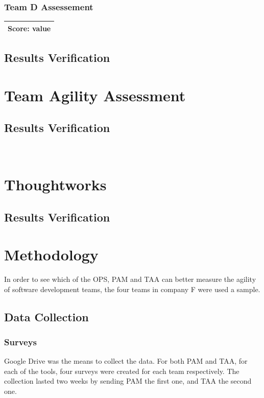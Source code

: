 \subsubsection{Team D Assessement}
\begin{tabular}{| p{3cm} | }
\hline
\textbf{Score:} value \\ \hline
\end{tabular}

\subsection{Results Verification}



\section{Team Agility Assessment}
\subsection{Results Verification}
~

\section{Thoughtworks}
\subsection{Results Verification}




\section{Methodology}
In order to see which of the OPS, PAM and TAA can better measure the agility of software development teams, the four teams in company F were used a sample.

\subsection{Data Collection}

\subsubsection{Surveys}
Google Drive \texttrademark \cite{google_drive} was the means to collect the data. For both PAM and TAA, for each of the tools, four surveys were created for each team respectively. The collection lasted two weeks by sending PAM the first one, and TAA the second one.

